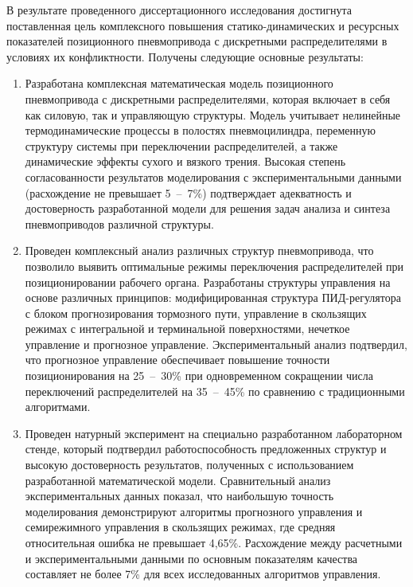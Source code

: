 В результате проведенного диссертационного исследования достигнута поставленная
цель комплексного повышения статико-динамических и ресурсных показателей позиционного пневмопривода с
дискретными распределителями в условиях их конфликтности. Получены следующие основные результаты:

\begin{enumerate}
    \item Разработана комплексная математическая модель позиционного пневмопривода с дискретными распределителями,
    которая включает в себя как силовую, так и управляющую структуры. Модель учитывает нелинейные термодинамические
    процессы в полостях пневмоцилиндра, переменную структуру системы при переключении распределителей, а также
    динамические эффекты сухого и вязкого трения. Высокая степень согласованности результатов моделирования с
    экспериментальными данными (расхождение не превышает 5~--~7\%) подтверждает адекватность и достоверность
    разработанной модели для решения задач анализа и синтеза пневмоприводов различной структуры.

    \item Проведен комплексный анализ различных структур пневмопривода, что позволило выявить оптимальные
    режимы переключения распределителей при позиционировании рабочего органа. Разработаны структуры управления
    на основе различных принципов: модифицированная структура ПИД-регулятора с блоком прогнозирования тормозного пути,
    управление в скользящих режимах с интегральной и терминальной поверхностями, нечеткое управление и прогнозное управление.
    Экспериментальный анализ подтвердил, что прогнозное управление обеспечивает повышение точности позиционирования на 25~--~30\%
    при одновременном сокращении числа переключений распределителей на 35~--~45\% по сравнению с традиционными алгоритмами.

    \item Проведен натурный эксперимент на специально разработанном лабораторном стенде, который подтвердил работоспособность
    предложенных структур и высокую достоверность результатов, полученных с использованием разработанной математической модели.
    Сравнительный анализ экспериментальных данных показал, что наибольшую точность моделирования демонстрируют алгоритмы прогнозного
    управления и семирежимного управления в скользящих режимах, где средняя относительная ошибка не превышает 4,65\%.
    Расхождение между расчетными и экспериментальными данными по основным показателям качества составляет
    не более 7\% для всех исследованных алгоритмов управления.


\end{enumerate}
